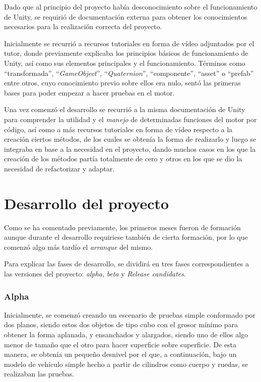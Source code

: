 Dado que al principio del proyecto había desconocimiento sobre el funcionamiento de Unity, se requirió de documentación externa para obtener los conocimientos necesarios para la realización correcta del proyecto.

Inicialmente se recurrió a recursos tutoriales en forma de vídeo adjuntados por el tutor, donde previamente explicaba los principios básicos de funcionamiento de Unity, así como sus elementos principales y el funcionamiento. Términos como ``transformada'', ``\textit{GameObject}'', ``\textit{Quaternion}'', ``componente'', ``asset'' o ``prefab'' entre otros, cuyo conocimiento previo sobre ellos era nulo, sentó las primeras bases para poder empezar a hacer pruebas en el motor.

Una vez comenzó el desarrollo se recurrió a la misma documentación de Unity para comprender la utilidad y el \textit{manejo} de determinadas funciones del motor por código, así como a más recursos tutoriales en forma de vídeo respecto a la creación ciertos métodos, de los cuales se obtenía la forma de realizarlo y luego se integraba en base a la necesidad en el proyecto, dando muchos casos en los que la creación de los métodos partía totalmente de cero y otros en los que se dio la necesidad de refactorizar y adaptar.

\section{Desarrollo del proyecto}

Como se ha comentado previamente, los primeros meses fueron de formación aunque durante el desarrollo requiriese también de cierta formación, por lo que comenzó algo más tardío el \textit{arranque} del mismo.

Para explicar las fases de desarrollo, se dividirá en tres fases correspondientes a las versiones del proyecto: \textit{alpha}, \textit{beta} y \textit{Release candidates}.

\subsubsection{Alpha}

Inicialmente, se comenzó creando un escenario de pruebas simple conformado por dos planos, siendo estos dos objetos de tipo cubo con el grosor mínimo para obtener la forma aplanada, y ensanchados y alargados, siendo uno de ellos algo menor de tamaño que el otro para hacer superficie sobre superficie. De esta manera, se obtenía un pequeño desnivel por el que, a continuación, bajo un modelo de vehículo simple hecho a partir de cilindros como cuerpo y ruedas, se realizaban las pruebas.

